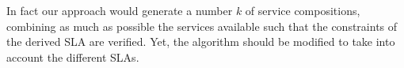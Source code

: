 



  In fact our approach would generate a number $k$ of service compositions, combining as much as possible the services available such that the constraints of the derived SLA are verified. 
 Yet, the algorithm should be modified to take into account the different SLAs. 



